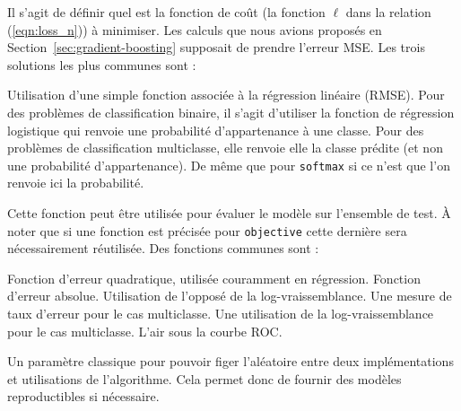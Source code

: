 Il s'agit de définir quel est la fonction de coût (la fonction $\ell$ dans la relation (\ref{eqn:loss_n})) à minimiser. Les calculs que nous avions proposés en Section~\ref{sec:gradient-boosting} supposait de prendre l'erreur MSE. Les trois solutions les plus communes sont :
\begin{itemize}
Utilisation d'une simple fonction associée à la  régression linéaire (RMSE).
Pour des problèmes de classification binaire, il s'agit d'utiliser la fonction de régression logistique qui renvoie une probabilité d'appartenance à une classe.
Pour des problèmes de classification multiclasse, elle renvoie elle la classe prédite (et non une probabilité d'appartenance).
De même que pour \texttt{softmax} si ce n'est que l'on renvoie ici la probabilité.
\end{itemize}
Cette fonction peut être utilisée pour évaluer le modèle sur l'ensemble de test. À noter que si une fonction est précisée pour \texttt{objective} cette dernière sera nécessairement réutilisée. Des fonctions communes sont :
\begin{itemize}
Fonction d'erreur quadratique, utilisée couramment en régression.
Fonction d'erreur absolue.
Utilisation de l'opposé de la log-vraissemblance.
Une mesure de taux d'erreur pour le cas multiclasse.
Une utilisation de la log-vraissemblance pour le cas multiclasse.
L'air sous la courbe ROC.
\end{itemize}
Un paramètre classique pour pouvoir \og figer\fg{} l'aléatoire entre deux implémentations et utilisations de l'algorithme. Cela permet donc de fournir des modèles reproductibles si nécessaire.

